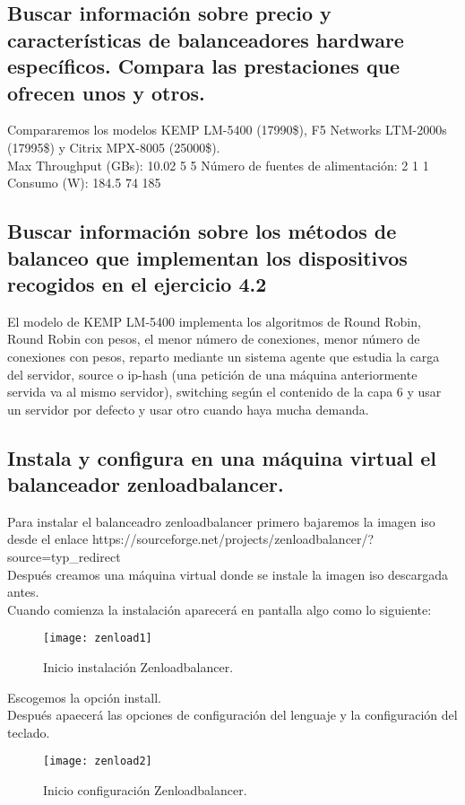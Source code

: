 \subsection{ Buscar información sobre precio y características de balanceadores hardware específicos. Compara las prestaciones que ofrecen unos y otros. }

Compararemos los modelos KEMP LM-5400 (17990\$), F5 Networks LTM-2000s (17995\$) y Citrix MPX-8005 (25000\$).\\
Max Throughput (GBs): 10.02 5 5 Número de fuentes de alimentación: 2 1 1
Consumo (W): 184.5 74 185

\subsection{ Buscar información sobre los métodos de balanceo que implementan los dispositivos recogidos en el ejercicio 4.2  }
El modelo de KEMP LM-5400 implementa los algoritmos de Round Robin, Round Robin con pesos, el menor número de conexiones, menor número de conexiones con pesos, reparto mediante un sistema agente que estudia la carga del servidor, source o ip-hash (una petición de una máquina anteriormente servida va al mismo servidor), switching según el contenido de la capa 6 y usar un servidor por defecto y usar otro cuando haya mucha demanda.

\subsection{ Instala y configura en una máquina virtual el balanceador zenloadbalancer. }
Para instalar el balanceadro zenloadbalancer primero bajaremos la imagen iso desde el enlace https://sourceforge.net/projects/zenloadbalancer/?source=typ\_redirect \\
Después creamos una máquina virtual donde se instale la imagen iso descargada antes.\\
Cuando comienza la instalación aparecerá en pantalla algo como lo siguiente:
\begin{figure}[H]
		\centering
		\texttt{[image: zenload1]}
		\caption{Inicio instalación Zenloadbalancer.}
		\label{figura 1}
\end{figure}
Escogemos la opción install.\\
Después apaecerá las opciones de configuración del lenguaje y la configuración del teclado.\\
\begin{figure}[H]
		\centering
		\texttt{[image: zenload2]}
		\caption{Inicio configuración Zenloadbalancer.}
		\label{figura 2}
\end{figure}

